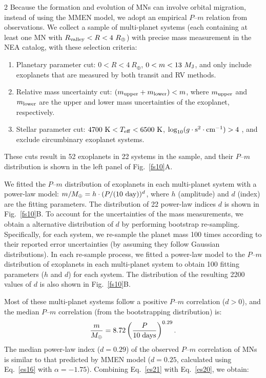 \documentclass[10pt]{article}
\begin{document}
\begin{multicols}{2}
Because the formation and evolution of MNs can involve orbital migration, instead of using the MMEN model, we adopt an empirical $P$--$m$ relation from observations.
We collect a sample of multi-planet systems (each containing at least one MN with $R_{\rm valley}<R<4~R_\oplus$) with precise mass measurement in the NEA catalog, with these selection criteria:
\begin{enumerate}
\item Planetary parameter cut: $0<R<4~R_\oplus$, $0<m<13~M_{\rm J}$, and only include exoplanets that are measured by both transit and RV methods.
\item Relative mass uncertainty cut: $(m_{\rm upper} +  m_{\rm lower})<m$, where $m_{\rm upper}$ and $m_{\rm lower}$ are the upper and lower mass uncertainties of the exoplanet, respectively.
\item Stellar parameter cut: $4700~{\rm K} < T_{\rm eff} < 6500~{\rm K}$, $\log_{10}(g\cdot{\rm s}^2\cdot{\rm cm}^{-1})>4$ , and exclude circumbinary exoplanet systems.
\end{enumerate}
These cuts result in 52 exoplanets in 22 systems in the sample, and their $P$--$m$ distribution is shown in the left panel of Fig.~\ref{fs10}A.

We fitted the $P$--$m$ distribution of exoplanets in each multi-planet system with a power-law model: $m/M_\oplus=h\cdot(P/(10~{\rm day}))^d$, where $h$ (amplitude) and $d$ (index) are the fitting parameters.
The distribution of 22 power-law indices $d$ is shown in Fig.~\ref{fs10}B.
To account for the uncertainties of the mass measurements, we obtain a alternative distribution of $d$ by performing bootstrap  re-sampling.
Specifically, for each system, we re-sample the planet mass 100 times according to their reported error uncertainties (by assuming they follow Gaussian distributions).
In each re-sample process, we fitted a power-law model to the $P$--$m$ distribution of exoplanets in each multi-planet system to obtain 100 fitting parameters ($h$ and $d$) for each system.
The distribution of the resulting 2200 values of $d$ is also shown in Fig.~\ref{fs10}B.

Most of these multi-planet systems follow a positive $P$--$m$ correlation ($d>0$), and the median $P$--$m$ correlation (from the bootstrapping distribution) is:
\begin{equation}
\label{es21}
\frac{m}{M_\oplus} = 8.72\left(\frac{P}{10\;{\rm days}}\right)^{0.29}.
\end{equation}
The median power-law index ($d=0.29$) of the observed $P$--$m$ correlation of MNs is similar to that predicted by MMEN model ($d=0.25$, calculated using Eq.~\ref{es16} with $\alpha=-1.75$)\cite{2020AJ....159..247D}.
Combining Eq.~\ref{es21} with Eq.~\ref{es20}, we obtain:
\end{multicols}
\end{document}
